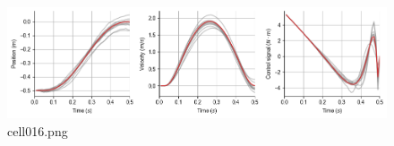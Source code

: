 \begin{figure}[ht]
	\centering
	\includegraphics[scale=0.8, max width=\linewidth]{./fig/motor-learning/optimal-feedback-control/cell016.png}
	\caption{cell016.png}
	\label{cell016.png}
\end{figure}